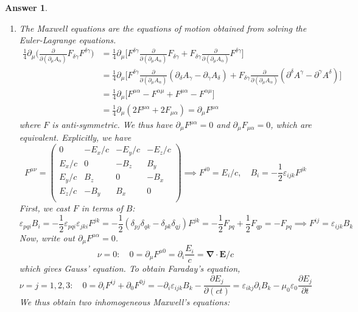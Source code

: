 \documentclass[a4paper]{article}
\newtheorem{ans}{Answer}[section]
\theoremstyle{new}
\begin{document}
\begin{ans}\leavevmode
\begin{enumerate}[label=(\alph*)]
\item The Maxwell equations are the equations of motion obtained from solving the Euler-Lagrange equations.
\begin{align}
    \frac{1}{4}\partial_\mu\bigg(\frac{\partial}{\partial(\partial_\mu A_\alpha)}F_{\delta\gamma}F^{\delta\gamma}\bigg)&=\frac{1}{4}\partial_\mu\bigg[F^{\delta\gamma}\frac{\partial}{\partial(\partial_\mu A_\alpha)}F_{\delta\gamma}+F_{\delta\gamma}\frac{\partial}{\partial(\partial_\mu A_\alpha)}F^{\delta\gamma}\bigg]\nonumber\\&=\frac{1}{4}\partial_\mu\bigg[F^{\delta\gamma}\frac{\partial}{\partial(\partial_\mu A_\alpha)}(\partial_\delta A_\gamma-\partial_\gamma A_\delta)+F_{\delta\gamma}\frac{\partial}{\partial(\partial_\mu A_\alpha)}(\partial^\delta A^\gamma-\partial^\gamma A^\delta)\bigg]\nonumber\\&=\frac{1}{4}\partial_\mu\bigg[F^{\mu\alpha}-F^{\alpha\mu}+F^{\mu\alpha}-F^{\alpha\mu}\bigg]\nonumber\\&=\frac{1}{4}\partial_\mu(2F^{\mu\alpha}+2F_{\mu\alpha})=\partial_\mu F^{\mu\alpha}\nonumber
\end{align}
where $F$ is anti-symmetric. We thus have $\partial_\mu F^{\mu\alpha}=0$ and $\partial_\mu F_{\mu\alpha}=0$, which are equivalent. Explicitly, we have
$$F^{\mu\nu}=\begin{pmatrix}0&-E_x/c&-E_y/c&-E_z/c\\E_x/c&0&-B_z&B_y\\E_y/c&B_z&0&-B_x\\E_z/c&-B_y&B_x&0\\\end{pmatrix}\implies F^{i0}=E_i/c,\quad B_i=-\frac{1}{2}\varepsilon_{ijk}F^{jk}$$
First, we cast $F$ in terms of $B$:
$$\varepsilon_{pqi}B_i=-\frac{1}{2}\varepsilon_{pqi}\varepsilon_{jki}F^{jk}=-\frac{1}{2}(\delta_{pj}\delta_{qk}-\delta_{pk}\delta_{qj})F^{jk}=-\frac{1}{2}F_{pq}+\frac{1}{2}F_{qp}=-F_{pq}\implies F^{ij}=\varepsilon_{ijk}B_k$$
Now, write out $\partial_\mu F^{\mu\alpha}=0$.
$$\nu=0:\quad 0=\partial_\mu F^{\mu0}=\partial_i\frac{E_i}{c}=\boldsymbol{\nabla}\cdot\mathbf{E}/c$$
which gives Gauss' equation. To obtain Faraday's equation,
$$\nu=j=1,2,3:\quad 0=\partial_iF^{ij}+\partial_0F^{0j}=-\partial_i\varepsilon_{ijk}B_k-\frac{\partial E_j}{\partial(ct)}=\varepsilon_{ikj}\partial_iB_k-\mu_0\varepsilon_0\frac{\partial E_j}{\partial t}$$
We thus obtain two inhomogeneous Maxwell's equations:

\end{enumerate}
\end{ans}
\end{document}

